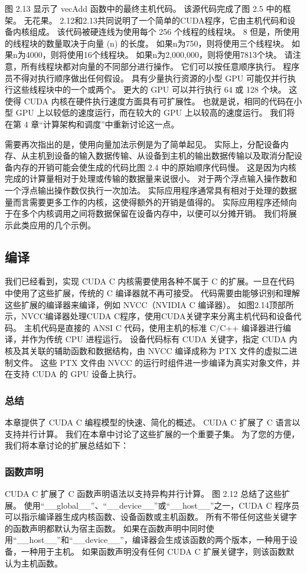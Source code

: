 图 2.13 显示了 vecAdd 函数中的最终主机代码。 该源代码完成了图 2.5 中的框架。 无花果。 2.12和2.13共同说明了一个简单的CUDA程序，它由主机代码和设备内核组成。 该代码被硬连线为使用每个 256 个线程的线程块。 8 但是，所使用的线程块的数量取决于向量 (n) 的长度。 如果n为750，则将使用三个线程块。 如果n为4000，则将使用16个线程块。 如果n为2,000,000，则将使用7813个块。 请注意，所有线程块都对向量的不同部分进行操作。 它们可以按任意顺序执行。 程序员不得对执行顺序做出任何假设。 具有少量执行资源的小型 GPU 可能仅并行执行这些线程块中的一个或两个。 更大的 GPU 可以并行执行 64 或 128 个块。 这使得 CUDA 内核在硬件执行速度方面具有可扩展性。 也就是说，相同的代码在小型 GPU 上以较低的速度运行，而在较大的 GPU 上以较高的速度运行。 我们将在第 4 章“计算架构和调度”中重新讨论这一点。

需要再次指出的是，使用向量加法示例是为了简单起见。 实际上，分配设备内存、从主机到设备的输入数据传输、从设备到主机的输出数据传输以及取消分配设备内存的开销可能会使生成的代码比图 2.4 中的原始顺序代码慢。 这是因为内核完成的计算量相对于处理或传输的数据量来说很小。 对于两个浮点输入操作数和一个浮点输出操作数仅执行一次加法。 实际应用程序通常具有相对于处理的数据量而言需要更多工作的内核，这使得额外的开销是值得的。 实际应用程序还倾向于在多个内核调用之间将数据保留在设备内存中，以便可以分摊开销。 我们将展示此类应用的几个示例。

\subsection{编译}
我们已经看到，实现 CUDA C 内核需要使用各种不属于 C 的扩展。一旦在代码中使用了这些扩展，传统的 C 编译器就不再可接受。 代码需要由能够识别和理解这些扩展的编译器来编译，例如 NVCC（NVIDIA C 编译器）。 如图2.14顶部所示，NVCC编译器处理CUDA C程序，使用CUDA关键字来分离主机代码和设备代码。 主机代码是直接的 ANSI C 代码，使用主机的标准 C/C++ 编译器进行编译，并作为传统 CPU 进程运行。 设备代码标有 CUDA 关键字，指定 CUDA 内核及其关联的辅助函数和数据结构，由 NVCC 编译成称为 PTX 文件的虚拟二进制文件。 这些 PTX 文件由 NVCC 的运行时组件进一步编译为真实对象文件，并在支持 CUDA 的 GPU 设备上执行。

\subsubsection{总结}
本章提供了 CUDA C 编程模型的快速、简化的概述。 CUDA C 扩展了 C 语言以支持并行计算。 我们在本章中讨论了这些扩展的一个重要子集。 为了您的方便，我们将本章讨论的扩展总结如下：

\subsubsection{函数声明}
CUDA C 扩展了 C 函数声明语法以支持异构并行计算。 图 2.12 总结了这些扩展。 使用“\_\_global\_\_”、“\_\_device\_\_”或“\_\_host\_\_”之一，CUDA C 程序员可以指示编译器生成内核函数、设备函数或主机函数。 所有不带任何这些关键字的函数声明都默认为宿主函数。 如果在函数声明中同时使用“\_\_host\_\_”和“\_\_device\_\_”，编译器会生成该函数的两个版本，一种用于设备，一种用于主机。 如果函数声明没有任何 CUDA C 扩展关键字，则该函数默认为主机函数。

